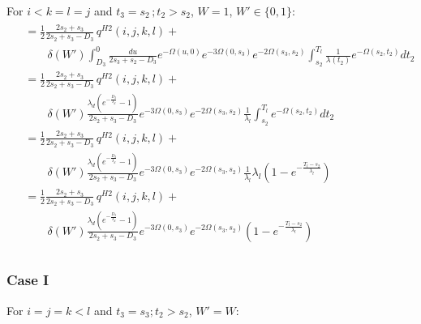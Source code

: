 \documentclass{article}
\begin{document}
For $i<k=l=j$ and $t_3=s_2\,;t_2>s_2$, $W = 1$, $W' \in \{0,1\}$:
\begin{align}
    \begin{split}
        &= \frac{1}{2}\frac{2s_2+s_3}{2s_2+s_3-D_3}\,q^{H2}(i,j,k,l)+\\
        &\qquad
        \delta(W')\int_{D_3}^{0}\frac{du}{2s_3+s_2-D_3}e^{-\Omega(u,0)}e^{-3\Omega(0,s_3)}e^{-2\Omega(s_3,s_2)}\int_{s_2}^{T_l}\frac{1}{\lambda(t_2)}e^{-\Omega(s_2,t_2)}dt_2\\
        &= \frac{1}{2}\frac{2s_2+s_3}{2s_2+s_3-D_3}\,q^{H2}(i,j,k,l)+\\
        &\qquad
        \delta(W')\frac{\lambda_d\left(e^{-\frac{D_3}{\lambda_d}}-1\right)}{2s_2+s_3-D_3}e^{-3\Omega(0,s_3)}e^{-2\Omega(s_3,s_2)}
        \frac{1}{\lambda_l}\int_{s_2}^{T_l}e^{-\Omega(s_2,t_2)}dt_2\\
        &= \frac{1}{2}\frac{2s_2+s_3}{2s_2+s_3-D_3}\,q^{H2}(i,j,k,l)+\\
        &\qquad
        \delta(W')\frac{\lambda_d\left(e^{-\frac{D_3}{\lambda_d}}-1\right)}{2s_2+s_3-D_3}e^{-3\Omega(0,s_3)}e^{-2\Omega(s_3,s_2)}
        \frac{1}{\lambda_l}\lambda_l\left(1-e^{-\frac{T_l-s_2}{\lambda_l}}\right)\\
        &= \frac{1}{2}\frac{2s_2+s_3}{2s_2+s_3-D_3}\,q^{H2}(i,j,k,l)+\\
        &\qquad
        \delta(W')\frac{\lambda_d\left(e^{-\frac{D_3}{\lambda_d}}-1\right)}{2s_2+s_3-D_3}e^{-3\Omega(0,s_3)}e^{-2\Omega(s_3,s_2)}
        \left(1-e^{-\frac{T_l-s_2}{\lambda_l}}\right)\\
    \end{split}
\end{align}

\subsubsection{Case I}
For $i=j=k<l$ and $t_3=s_3;t_2>s_2$, $W' = W$:
\end{document}
